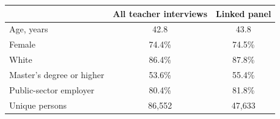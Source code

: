 \begin{tabular}{lcc}
\toprule
 & All teacher interviews & Linked panel \\
\midrule
Age, years & 42.8 & 43.8 \\
Female & 74.4\% & 74.5\% \\
White & 86.4\% & 87.8\% \\
Master's degree or higher & 53.6\% & 55.4\% \\
Public-sector employer & 80.4\% & 81.8\% \\
\midrule
Unique persons & 86,552 & 47,633 \\
\bottomrule
\end{tabular}
